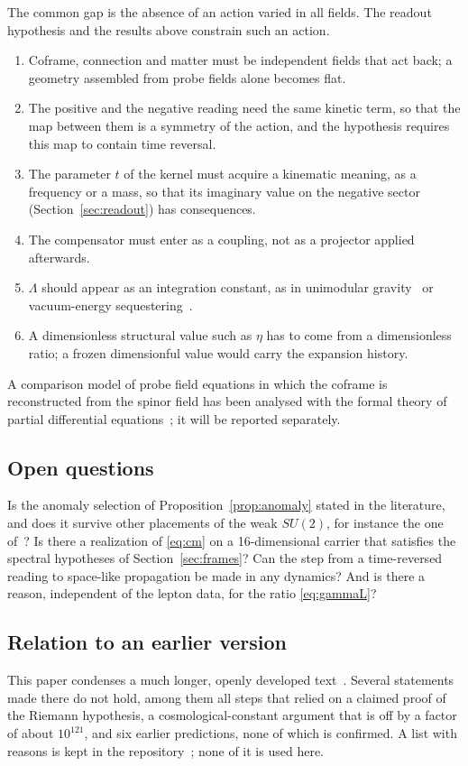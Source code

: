 The common gap is the absence of an action varied in all fields.  The readout hypothesis and the results above constrain such an action.
\begin{enumerate}
\item Coframe, connection and matter must be independent fields that act back; a geometry assembled from probe fields alone becomes flat.
\item The positive and the negative reading need the same kinetic term, so that the map between them is a symmetry of the action, and the
hypothesis requires this map to contain time reversal.
\item The parameter \(t\) of the kernel must acquire a kinematic meaning, as a frequency or a mass, so that its imaginary value on the negative
sector (Section~\ref{sec:readout}) has consequences.
\item The compensator must enter as a coupling, not as a projector applied afterwards.
\item \(\Lambda\) should appear as an integration constant, as in unimodular gravity~\cite{henneaux} or vacuum-energy sequestering~\cite{kaloper}.
\item A dimensionless structural value such as \(\eta\) has to come from a dimensionless ratio; a frozen dimensionful value would carry the
expansion history.
\end{enumerate}
A comparison model of probe field equations in which the coframe is reconstructed from the spinor field has been analysed with the formal
theory of partial differential equations~\cite{bryant,seiler}; it will be reported separately.

\subsection{Open questions}

Is the anomaly selection of Proposition~\ref{prop:anomaly} stated in the literature, and does it survive other placements of the weak
\(SU(2)\), for instance the one of~\cite{fureyhughes}?  Is there a realization of \eqref{eq:cm} on a 16-dimensional carrier that satisfies the
spectral hypotheses of Section~\ref{sec:frames}?  Can the step from a time-reversed reading to space-like propagation be made in any
dynamics?  And is there a reason, independent of the lepton data, for the ratio \eqref{eq:gammaL}?

\subsection{Relation to an earlier version}

This paper condenses a much longer, openly developed text~\cite{companion}.  Several statements made there do not hold, among them all steps
that relied on a claimed proof of the Riemann hypothesis, a cosmological-constant argument that is off by a factor of about \(10^{121}\), and
six earlier predictions, none of which is confirmed.  A list with reasons is kept in the repository~\cite{repo}; none of it is used here.
